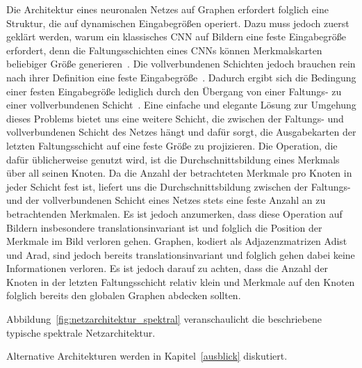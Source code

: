 Die Architektur eines neuronalen Netzes auf Graphen erfordert folglich eine Struktur, die auf dynamischen Eingabegrößen operiert.
Dazu muss jedoch zuerst geklärt werden, warum ein klassisches \gls{CNN} auf Bildern eine feste Eingabegröße erfordert, denn die Faltungsschichten eines \glspl{CNN} können Merkmalskarten beliebiger Größe generieren~\cite{spp}.
Die vollverbundenen Schichten jedoch brauchen rein nach ihrer Definition eine feste Eingabegröße~\cite{spp}.
Dadurch ergibt sich die Bedingung einer festen Eingabegröße lediglich durch den Übergang von einer Faltungs- zu einer vollverbundenen Schicht~\cite{spp}.
Eine einfache und elegante Lösung zur Umgehung dieses Problems bietet uns eine weitere Schicht, die zwischen der Faltungs- und vollverbundenen Schicht des Netzes hängt und dafür sorgt, die Ausgabekarten der letzten Faltungsschicht auf eine feste Größe zu projizieren.
Die Operation, die dafür üblicherweise genutzt wird, ist die Durchschnittsbildung eines Merkmals über all seinen Knoten.
Da die Anzahl der betrachteten Merkmale pro Knoten in jeder Schicht fest ist, liefert uns die Durchschnittsbildung zwischen der Faltungs- und der vollverbundenen Schicht eines Netzes stets eine feste Anzahl an zu betrachtenden Merkmalen.
Es ist jedoch anzumerken, dass diese Operation auf Bildern insbesondere translationsinvariant ist und folglich die Position der Merkmale im Bild verloren gehen.
Graphen, kodiert als Adjazenzmatrizen \gls{Adist} und \gls{Arad}, sind jedoch bereits translationsinvariant und folglich gehen dabei keine Informationen verloren.
Es ist jedoch darauf zu achten, dass die Anzahl der Knoten in der letzten Faltungsschicht relativ klein und Merkmale auf den Knoten folglich bereits den globalen Graphen abdecken sollten.

Abbildung~\ref{fig:netzarchitektur_spektral} veranschaulicht die beschriebene typische spektrale Netzarchitektur.

Alternative Architekturen werden in Kapitel~\ref{ausblick} diskutiert.
